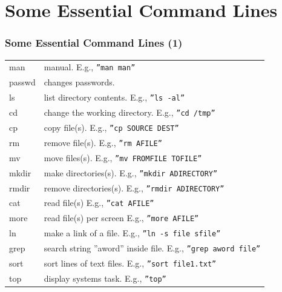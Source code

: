 \documentclass[aspectratio=169, xcolor=table, notheorems, hyperref={pdfpagelabels=false}]{beamer}
\begin{document}
\section{Some Essential Command Lines}
\begin{frame}
\frametitle{Some Essential Command Lines (1)}
\begin{tabular}{l l}
\hline
man    & manual. E.g., \texttt{''man man''}                                       \\
passwd & changes passwords.                                                       \\
ls     & list directory contents.  E.g., \texttt{''ls -al''}                      \\
cd     & change the working directory. E.g., \texttt{''cd /tmp''}                 \\
cp     & copy file(s). E.g., \texttt{''cp SOURCE DEST''}                          \\
rm     & remove file(s).  E.g., \texttt{''rm AFILE''}                             \\
mv     & move files(s).        E.g., \texttt{''mv FROMFILE TOFILE''}              \\
mkdir  & make directories(s).        E.g., \texttt{''mkdir ADIRECTORY''}          \\
rmdir  & remove directories(s).        E.g., \texttt{''rmdir ADIRECTORY''}        \\
cat    & read file(s)      E.g., \texttt{''cat AFILE''}                           \\
more   & read file(s) per screen      E.g., \texttt{''more AFILE''}               \\
ln     & make a link of a file. E.g., \texttt{''ln -s file sfile''}               \\
grep   & search string ''aword'' inside file.  E.g., \texttt{''grep aword file''} \\
sort   & sort lines of text files. E.g., \texttt{''sort file1.txt''}              \\
top    & display systems task.  E.g., \texttt{''top''}                            \\
\hline
\end{tabular}
\end{frame}
\end{document}
